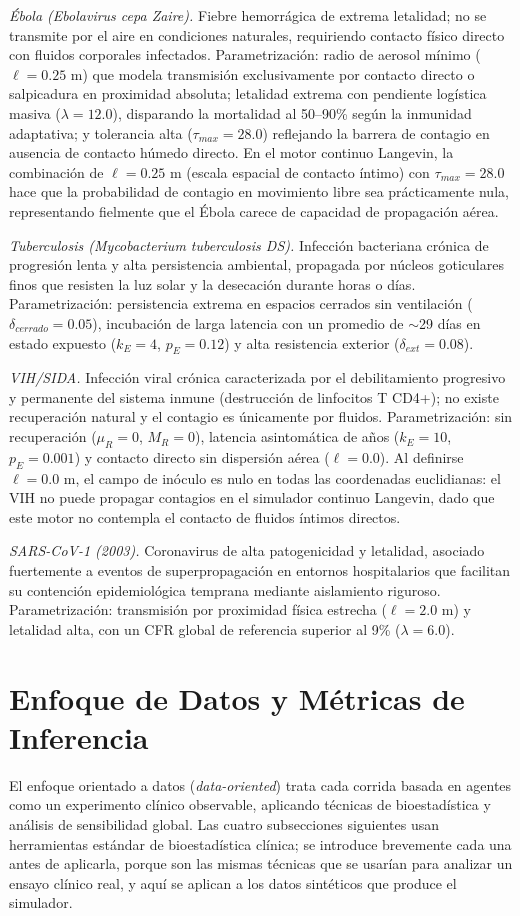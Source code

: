 \documentclass[conference]{IEEEtran}
\begin{document}
\textit{Ébola (Ebolavirus cepa Zaire).} Fiebre hemorrágica de extrema letalidad; no se transmite por el aire en condiciones naturales, requiriendo contacto físico directo con fluidos corporales infectados. Parametrización: radio de aerosol mínimo ($\ell=0.25$ m) que modela transmisión exclusivamente por contacto directo o salpicadura en proximidad absoluta; letalidad extrema con pendiente logística masiva ($\lambda=12.0$), disparando la mortalidad al 50--90\% según la inmunidad adaptativa; y tolerancia alta ($\tau_{max}=28.0$) reflejando la barrera de contagio en ausencia de contacto húmedo directo. En el motor continuo Langevin, la combinación de $\ell=0.25$ m (escala espacial de contacto íntimo) con $\tau_{max}=28.0$ hace que la probabilidad de contagio en movimiento libre sea prácticamente nula, representando fielmente que el Ébola carece de capacidad de propagación aérea.

\textit{Tuberculosis (\textit{Mycobacterium tuberculosis} DS).} Infección bacteriana crónica de progresión lenta y alta persistencia ambiental, propagada por núcleos goticulares finos que resisten la luz solar y la desecación durante horas o días. Parametrización: persistencia extrema en espacios cerrados sin ventilación ($\delta_{cerrado}=0.05$), incubación de larga latencia con un promedio de $\sim$29 días en estado expuesto ($k_E=4$, $p_E=0.12$) y alta resistencia exterior ($\delta_{ext}=0.08$).

\textit{VIH/SIDA.} Infección viral crónica caracterizada por el debilitamiento progresivo y permanente del sistema inmune (destrucción de linfocitos T CD4+); no existe recuperación natural y el contagio es únicamente por fluidos. Parametrización: sin recuperación ($\mu_R=0$, $M_R=0$), latencia asintomática de años ($k_E=10$, $p_E=0.001$) y contacto directo sin dispersión aérea ($\ell=0.0$). Al definirse $\ell=0.0$ m, el campo de inóculo es nulo en todas las coordenadas euclidianas: el VIH no puede propagar contagios en el simulador continuo Langevin, dado que este motor no contempla el contacto de fluidos íntimos directos.

\textit{SARS-CoV-1 (2003).} Coronavirus de alta patogenicidad y letalidad, asociado fuertemente a eventos de superpropagación en entornos hospitalarios que facilitan su contención epidemiológica temprana mediante aislamiento riguroso. Parametrización: transmisión por proximidad física estrecha ($\ell=2.0$ m) y letalidad alta, con un CFR global de referencia superior al 9\% ($\lambda=6.0$).

\section{Enfoque de Datos y Métricas de Inferencia}
El enfoque orientado a datos (\textit{data-oriented}) trata cada corrida basada en agentes como un experimento clínico observable, aplicando técnicas de bioestadística y análisis de sensibilidad global. Las cuatro subsecciones siguientes usan herramientas estándar de bioestadística clínica; se introduce brevemente cada una antes de aplicarla, porque son las mismas técnicas que se usarían para analizar un ensayo clínico real, y aquí se aplican a los datos sintéticos que produce el simulador.
\end{document}
